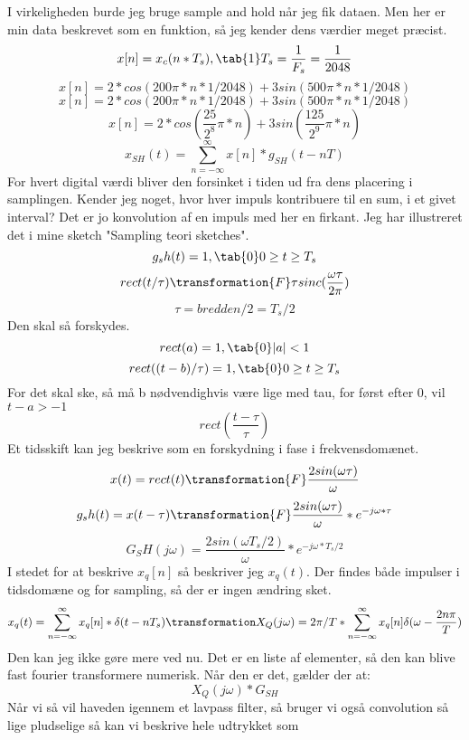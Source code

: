 \begin{Opgaver}
\begin{kapitel}
\begin{Opgave}
\begin{UnderOpgave}
            \end{UnderOpgave}
            \begin{UnderOpgave}
                I virkeligheden burde jeg bruge sample and hold når jeg fik dataen. Men her er min data beskrevet som en funktion, så jeg kender dens værdier meget præcist. 
                \[x[n] = x_c(n*T_s), \tab{1} T_s = \frac{1}{F_s} = \frac{1}{2048}\]
                \[x[n] = 2*cos(200\pi*n*1/2048) + 3sin(500\pi*n*1/2048)\]
                \[x[n] = 2*cos(200\pi*n*1/2048) + 3sin(500\pi*n*1/2048)\]
                \[x[n] = 2*cos(\frac{25}{2^8}\pi*n) + 3sin(\frac{125}{2^9}\pi*n)\]
                \[x_{SH}(t) = \sum_{n=-\infty}^{\infty}x[n]*g_{SH}(t - nT)\]
                For hvert digital værdi bliver den forsinket i tiden ud fra dens placering i samplingen. 
                Kender jeg noget, hvor hver impuls kontribuere til en sum, i et givet interval? 
                Det er jo konvolution af en impuls med her en firkant. Jeg har illustreret det i mine sketch "Sampling teori sketches". 
                \[g_sh(t) = 1, \tab{0} 0 \geq t \geq T_s\]
                \[rect(t/\tau) \transformation{F} \tau sinc(\frac{\omega \tau}{2\pi})\]
                \[\tau = bredden/2 = T_s/2\]
                Den skal så forskydes. 
                \[rect(a) = 1, \tab{0} |a| < 1 \]
                \[rect((t - b)/\tau) = 1, \tab{0} 0\geq t \geq T_s\]
                For det skal ske, så må b nødvendighvis være lige med tau, for først efter 0, vil $t - a > -1$
                \[rect(\frac{t - \tau}{\tau})\]
                Et tidsskift kan jeg beskrive som en forskydning i fase i frekvensdomænet. 
                \[x(t) = rect(t) \transformation{F} \frac{2 sin(\omega \tau)}{\omega}\]
                \[g_sh(t) = x(t - \tau) \transformation{F} \frac{2 sin(\omega \tau)}{\omega} * e^{-j\omega*\tau}\]
                \[G_SH(j\omega) = \frac{2 sin(\omega T_s/2)}{\omega} * e^{-j\omega*T_s/2}\] 
                I stedet for at beskrive $x_q[n]$ så beskriver jeg $x_q(t)$. Der findes både impulser i tidsdomæne og for sampling, så der er ingen ændring sket. 
                \[x_q(t) = \sum_{n=-\infty}^{\infty} x_q[n] * \delta(t - nT_s) \transformation X_Q(j\omega) = 2\pi/T * \sum_{n=-\infty}^{\infty}{x_q[n]\delta(\omega - \frac{2n\pi}{T})}\]
                Den kan jeg ikke gøre mere ved nu. Det er en liste af elementer, så den kan blive fast fourier transformere numerisk. Når den er det, gælder der at: 
                \[X_Q(j\omega)*G_{SH}\]
                Når vi så vil haveden igennem et lavpass filter, så bruger vi også convolution så lige pludselige så kan vi beskrive hele udtrykket som 

\end{UnderOpgave}
\end{Opgave}
\end{kapitel}
\end{Opgaver}
